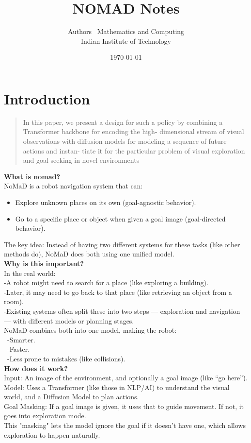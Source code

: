 \documentclass[12pt]{article}
\title{NOMAD Notes}
\author{Authors \ Mathematics and Computing \\ Indian Institute of Technology}
\date{\today}
\begin{document}
\maketitle
\section{Introduction}
\begin{quote}
In this paper, we present a design for such a policy by
combining a Transformer backbone for encoding the high-
dimensional stream of visual observations with diffusion
models for modeling a sequence of future actions and instan-
tiate it for the particular problem of visual exploration and
goal-seeking in novel environments
\end{quote}
\textbf{What is nomad?}\\
NoMaD is a robot navigation system that can:
\begin{itemize}
    \item Explore unknown places on its own (goal-agnostic behavior).
    \item Go to a specific place or object when given a goal image (goal-directed behavior).
\end{itemize}
The key idea: Instead of having two different systems for these tasks (like other methods do), NoMaD does both using one unified model.\\

\textbf{Why is this important?}\\

In the real world:\\
-A robot might need to search for a place (like exploring a building).\\
-Later, it may need to go back to that place (like retrieving an object from a room).\\
-Existing systems often split these into two steps — exploration and navigation — with different models or planning stages.\\
NoMaD combines both into one model, making the robot:\\
\ -Smarter.\\
\ -Faster.\\
\ -Less prone to mistakes (like collisions).\\

\textbf{How does it work?}\\

Input: An image of the environment, and optionally a goal image (like “go here”).\\
Model: Uses a Transformer (like those in NLP/AI) to understand the visual world, and a Diffusion Model to plan actions.\\
Goal Masking: If a goal image is given, it uses that to guide movement. If not, it goes into exploration mode.\\
This "masking" lets the model ignore the goal if it doesn't have one, which allows exploration to happen naturally.\\
\end{document}
